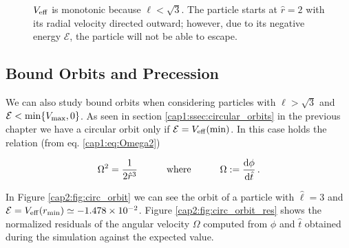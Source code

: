 \begin{figure}[h!]
\begin{minipage}{0.48\textwidth}
        \caption{$V_{\rm eff}$ is monotonic because $\ell < \sqrt{3}$.
        The particle starts at $\hat r = 2$ with its radial velocity
        directed outward; however, due to its negative energy $\mathcal E$, the
        particle will not be able to escape.}
    \end{minipage}
\end{figure}


\subsection{Bound Orbits and Precession}

We can also study bound orbits when considering particles with
$\hat \ell > \sqrt{3}$ and $\mathcal E < \min \{V_{\rm max}, 0\}$.
As seen in section \ref{cap1:ssec:circular_orbits} in the previous chapter we
have a circular orbit only if $\mathcal E = V_{\rm eff}({\rm min})$.
In this case holds the relation (from eq. \ref{cap1:eq:Omega2})

\begin{equation}
    \Omega^2 = \frac{1}{2 \hat r^3}
    \quad \quad \quad {\rm where} \quad \quad \quad
    \Omega := \dv{\phi}{\hat t} \, .
\end{equation}

In Figure \ref{cap2:fig:circ_orbit} we can see the orbit of a particle with
$\hat \ell = 3$ and $\mathcal E = V_{\rm eff}(r_{\rm min}) \simeq
\num{-1.478e-02}$.
Figure \ref{cap2:fig:circ_orbit_res} shows the normalized residuals of the
angular velocity $\Omega$ computed from $\phi$ and $\hat t$ obtained during the
simulation against the expected value.

